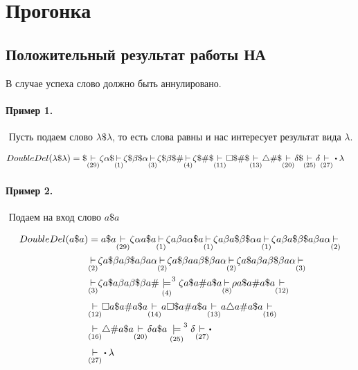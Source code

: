 \section{Прогонка}

\subsection{Положительный результат работы НА}

В случае успеха слово должно быть аннулировано.

\paragraph*{Пример 1.} ${}$ \newline
Пусть подаем слово $\lambda\$\lambda$, то есть слова равны и нас интересует результат
вида  $\lambda$.

\begin{align*}
    DoubleDel(\lambda\$\lambda) &= \$ \underset{(29)}{\step} \zeta\alpha\$
    \underset{(1)}{\step} \zeta\$\beta\$\alpha \underset{(3)}{\step} \zeta\$\beta\$\#
    \underset{(4)}{\step} \zeta\$\#\$ \underset{(11)}{\step} \square\$\#\$
    \underset{(13)}{\step} \triangle\#\$ \underset{(20)}{\step} \delta\$
    \underset{(25)}{\step} \delta \underset{(27)}{\step}\bigcdot \lambda
\end{align*}


\paragraph*{Пример 2.} ${}$ \newline
Подаем на вход слово $a\$a$

 \begin{align*}
     DoubleDel(a\$a) &= a\$a \underset{(29)}{\step} \zeta\alpha a\$a
     \underset{(1)}{\step} \zeta a\beta a\alpha\$a \underset{(1)}{\step}
     \zeta a\beta a \$\beta\$ \alpha a \underset{(1)}{\step}
     \zeta a\beta a \$\beta\$ a\beta a\alpha \underset{(2)}{\step}\\
                     &\underset{(2)}{\step} \zeta a\$\beta a\beta\$a\beta a\alpha \underset{(2)}{\step}
                     \zeta a\$\beta aa\beta\$\beta a\alpha \underset{(2)}{\step}
                     \zeta a\$a\beta a\beta\$\beta a\alpha \underset{(3)}{\step}\\
                     &\underset{(3)}{\step} \zeta a\$a\beta a\beta\$\beta a\#
                     \underset{(4)}{\models}^{3} \zeta a\$a\#a\$a
                     \underset{(8)}{\step} \rho a\$a\#a\$a \underset{(12)}{\step}\\
                     &\underset{(12)}{\step} \square a\$a\#a\$a \underset{(14)}{\step}
                     a\square\$a\#a\$a \underset{(13)}{\step}
                     a\triangle a\#a\$a \underset{(16)}{\step}\\
                     &\underset{(16)}{\step} \triangle\#a\$a \underset{(20)}{\step}
                     \delta a\$a \underset{(25)}{\models}^{3} \delta
                     \underset{(27)}{\step}\bigcdot\\
                     &\underset{(27)}{\step}\bigcdot \lambda
\end{align*}

